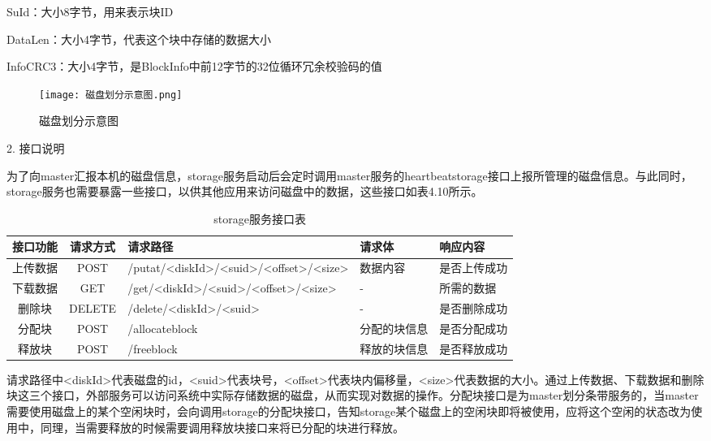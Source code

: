 SuId：大小8字节，用来表示块ID

DataLen：大小4字节，代表这个块中存储的数据大小

InfoCRC3：大小4字节，是BlockInfo中前12字节的32位循环冗余校验码的值

\begin{figure}
  \centering
  \texttt{[image: 磁盘划分示意图.png]}
  \caption{磁盘划分示意图}
\end{figure}

2. 接口说明

为了向master汇报本机的磁盘信息，storage服务启动后会定时调用master服务的heartbeatstorage接口上报所管理的磁盘信息。与此同时，storage服务也需要暴露一些接口，以供其他应用来访问磁盘中的数据，这些接口如表4.10所示。

\begin{table}[h]
    \centering
    \caption{storage服务接口表}
    \begin{tabular}{ccp{4cm}p{2cm}p{3cm}}
      \toprule
      接口功能   & 请求方式    & 请求路径     & 请求体    & 响应内容                     \\
      \midrule
      上传数据      & POST   & /putat/<diskId>/<suid>\newline/<offset>/<size> & 数据内容      & 是否上传成功\\
      下载数据      & GET    & /get/<diskId>\newline/<suid>/<offset>/<size>   & -            & 所需的数据\\
      删除块        & DELETE & /delete/<diskId>/<suid>                        & -            & 是否删除成功\\
      分配块        & POST   & /allocateblock                                 & 分配的块信息  & 是否分配成功\\
      释放块        & POST   & /freeblock                                     & 释放的块信息  & 是否释放成功\\
      \bottomrule
    \end{tabular}
\end{table}	

请求路径中<diskId>代表磁盘的id，<suid>代表块号，<offset>代表块内偏移量，<size>代表数据的大小。通过上传数据、下载数据和删除块这三个接口，外部服务可以访问系统中实际存储数据的磁盘，从而实现对数据的操作。分配块接口是为master划分条带服务的，当master需要使用磁盘上的某个空闲块时，会向调用storage的分配块接口，告知storage某个磁盘上的空闲块即将被使用，应将这个空闲的状态改为使用中，同理，当需要释放的时候需要调用释放块接口来将已分配的块进行释放。


